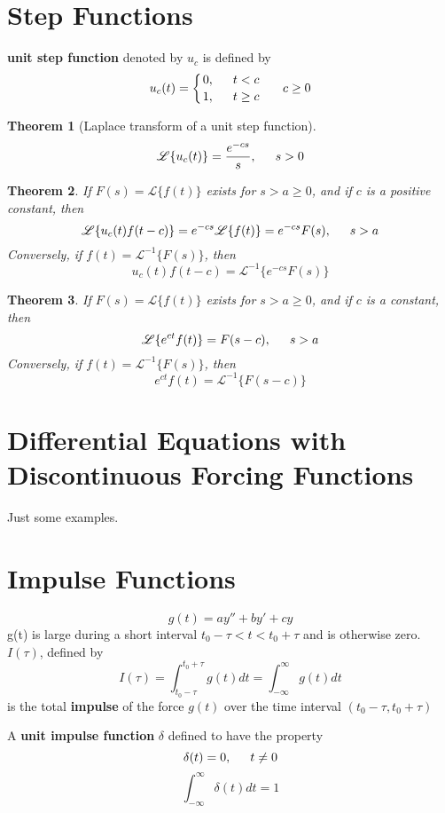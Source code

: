 \documentclass[letter]{article}
\newcommand{\laplace}[1]{\mathscr{L}\{#1\}}
\newcommand{\ilaplace}[1]{\mathscr{L}^{-1}\{#1\}}
\newcommand{\fracnoline}[2]{\genfrac{}{}{0pt}{}{#1}{#2}}
\newtheorem{theorem}{Theorem}[section]
\newenvironment{definition}[1][Definition]{\begin{trivlist}
\item[\hskip \labelsep {\bfseries #1}]}{\end{trivlist}}
\begin{document}
\section{Step Functions}
\begin{definition}
\textbf{unit step function} denoted by $u_c$ is defined by 
\[
u_c(t) = \left\{
\fracnoline{0, \indent t<c}
{1, \indent t\geq c} \right. \indent c\geq 0
\]
\end{definition}

\begin{theorem}[Laplace transform of a unit step function]
\[\laplace{u_c(t)} = \frac{e^{-cs}}{s},\indent s>0\]
\end{theorem}

\begin{theorem}
If $F(s) = \laplace{f(t)}$ exists for $s>a\geq 0$, and if $c$ is a positive constant, then
\[
\laplace{u_c(t) f(t-c)} = e^{-cs}\laplace{f(t)} = e^{-cs}F(s), \indent s>a
\]
Conversely, if $f(t) = \ilaplace{F(s)}$, then
\[
u_c(t)f(t-c) =  \ilaplace{e^{-cs}F(s)}
\]
\end{theorem}

\begin{theorem}
If $F(s) = \laplace{f(t)}$ exists for $s>a\geq 0$, and if $c$ is a constant, then
\[
\laplace{e^{ct} f(t)} =F(s-c), \indent s>a
\]
Conversely, if $f(t) = \ilaplace{F(s)}$, then
\[
e^{ct} f(t) =  \ilaplace{F(s-c)}
\]
\end{theorem}

\section{Differential Equations with Discontinuous Forcing Functions}
Just some examples.

\section{Impulse Functions}
\begin{definition}
\[  g(t) = ay'' + by'+cy \]
g(t) is large during a short interval $t_0 - \tau < t < t_0 + \tau$ and is otherwise zero.
$I(\tau)$, defined by
\[
I(\tau) = \int_{t_0-\tau}^{t_0+\tau} g(t) dt = \int_{-\infty}^\infty g(t) dt \]
is the total \textbf{impulse} of the force $g(t)$ over the time interval $(t_0-\tau, t_0+\tau)$
\end{definition}

\begin{definition}
A \textbf{unit impulse function} $\delta$ defined to have the property
\[\delta(t) = 0,\indent t\neq 0\]
\[\int_{-\infty}^{\infty} \delta(t) dt = 1\]
\end{definition}
\end{document}
